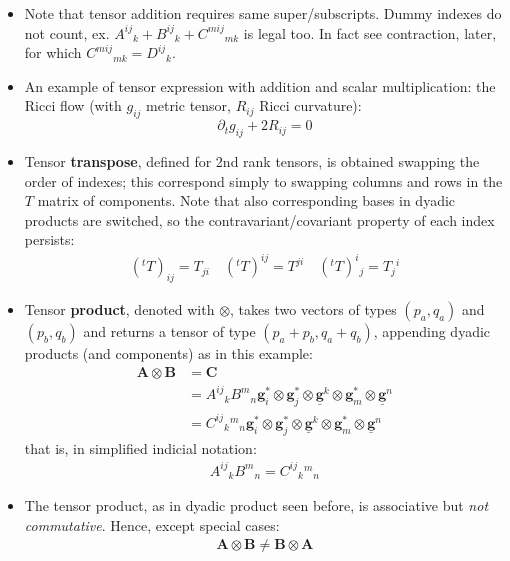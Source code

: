 \documentclass{digitaldynamics}
\def\vcovar#1{{\bm{#1}}^*}
\def\vcontr#1{\underline{\bm{#1}}}
\def\tensor#1{\bm{#1}}
\begin{document}
\begin{itemize}
	\item Note that tensor addition requires same super/subscripts. Dummy indexes do not count, ex. 
	${A}^{ij}{}_k + {B}^{ij}{}_k + {C}^{mij}{}_{mk}$ is legal too. In fact see contraction, later, for which ${C}^{mij}{}_{mk}={D}^{ij}{}_k$.
	
	\item An example of tensor expression with addition and scalar multiplication: the Ricci flow (with $g_{ij}$ metric tensor, $R_{ij}$ Ricci curvature):
	\[
	\partial_t g_{ij} + 2 R_{ij} = 0 
	\]
	
	
	\item Tensor \textbf{transpose}, defined for 2nd rank tensors, is obtained swapping the order of indexes; this correspond simply to swapping columns and rows in the $T$ matrix of components. Note that also corresponding bases in dyadic products are switched, so the contravariant/covariant property of each index persists:
	\begin{align}
	 ({}^t T)_{ij} = T_{ji} \quad 
	 ({}^t T)^{ij} = T^{ji} \quad
	 ({}^t T)^{i}{}_{j} = T_{j}{}^{i}
	\label{eq:transpose}
	\end{align}
	
	\item Tensor \textbf{product}, denoted with $\otimes$, takes two vectors of types $(p_a,q_a)$ and $(p_b,q_b)$  
	and returns a tensor of type $(p_a+p_b, q_a+q_b)$, appending dyadic products (and components) as in this example:
	\begin{align}
	 \tensor{A} \otimes \tensor{B} &= \tensor{C} \\
																 &= A^{ij}{}_{k} B^{m}{}_{n} 
																     \vcovar{g}_i \otimes \vcovar{g}_j \otimes \vcontr{g}^k 
																		 \otimes
																		 \vcovar{g}_m \otimes \vcontr{g}^n \\
																 &= C^{ij}{}_{k}{}^{m}{}_{n} 
																		 \vcovar{g}_i \otimes \vcovar{g}_j \otimes \vcontr{g}^k 
																		 \otimes
																		 \vcovar{g}_m \otimes \vcontr{g}^n
	\label{eq:tensorproduct}
	\end{align}
	that is, in simplified indicial notation:
	\begin{align}
						 A^{ij}{}_{k} B^{m}{}_{n} = C^{ij}{}_{k}{}^{m}{}_{n}								 
	\label{eq:tensorproductindicial}
	\end{align}
	
	\item The tensor product, as in dyadic product seen before, is associative but \textit{not commutative}. Hence, except special cases: 
	\begin{align}
	 \tensor{A} \otimes \tensor{B} \neq \tensor{B} \otimes \tensor{A}
	\label{eq:tensorproduct}
	\end{align}
	

\end{itemize}
\end{document}
